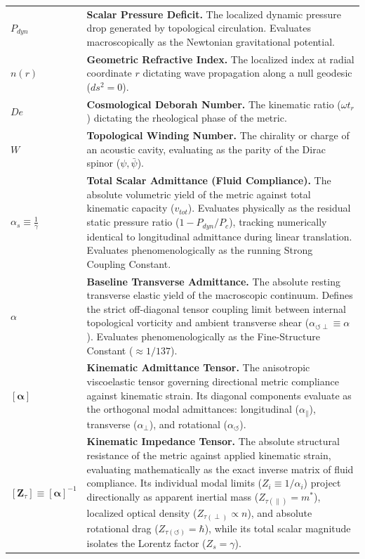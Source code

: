 \documentclass[11pt, a4paper]{article}
\begin{document}
\begin{tcolorbox}[colback=white, colframe=academiabrown!90!black, arc=1mm, boxrule=0.8pt, title={\textbf{TABLE 1: KINEMATIC NOMENCLATURE \& METRIC CONSTANTS}}]
\begin{tabular}{p{} p{}}
    $P_{dyn}$ & \textbf{Scalar Pressure Deficit.} The localized dynamic pressure drop generated by topological circulation. Evaluates macroscopically as the Newtonian gravitational potential. \\
    $n(r)$ & \textbf{Geometric Refractive Index.} The localized index at radial coordinate $r$ dictating wave propagation along a null geodesic ($ds^2 = 0$). \\
    $De$ & \textbf{Cosmological Deborah Number.} The kinematic ratio ($\omega t_r$) dictating the rheological phase of the metric. \\
    $W$ & \textbf{Topological Winding Number.} The chirality or charge of an acoustic cavity, evaluating as the parity of the Dirac spinor ($\psi, \bar{\psi}$). \\
    $\alpha_s \equiv \frac{1}{\gamma}$ & \textbf{Total Scalar Admittance (Fluid Compliance).} The absolute volumetric yield of the metric against total kinematic capacity ($v_{tot}$). Evaluates physically as the residual static pressure ratio ($1 - P_{dyn}/P_c$), tracking numerically identical to longitudinal admittance during linear translation. Evaluates phenomenologically as the running Strong Coupling Constant. \\
    $\alpha$ & \textbf{Baseline Transverse Admittance.} The absolute resting transverse elastic yield of the macroscopic continuum. Defines the strict off-diagonal tensor coupling limit between internal topological vorticity and ambient transverse shear ($\alpha_{\circlearrowleft \perp} \equiv \alpha$). Evaluates phenomenologically as the Fine-Structure Constant ($\approx 1/137$). \\
    $[\boldsymbol{\alpha}]$ & \textbf{Kinematic Admittance Tensor.} The anisotropic viscoelastic tensor governing directional metric compliance against kinematic strain. Its diagonal components evaluate   as the orthogonal modal admittances: longitudinal ($\alpha_{\parallel}$), transverse ($\alpha_{\perp}$), and rotational ($\alpha_{\circlearrowleft}$). \\
    $[\boldsymbol{Z}_{\tau}] \equiv [\boldsymbol{\alpha}]^{-1}$ & \textbf{Kinematic Impedance Tensor.} The absolute structural resistance of the metric against applied kinematic strain, evaluating mathematically as the exact inverse matrix of fluid compliance. Its individual modal limits ($Z_i \equiv 1/\alpha_i$) project directionally as apparent inertial mass ($Z_{\tau(\parallel)} = m^*$), localized optical density ($Z_{\tau(\perp)} \propto n$), and absolute rotational drag ($Z_{\tau(\circlearrowleft)} = \hbar$), while its total scalar magnitude isolates the Lorentz factor ($Z_s = \gamma$). \\

\end{tabular}
\end{tcolorbox}
\end{document}
